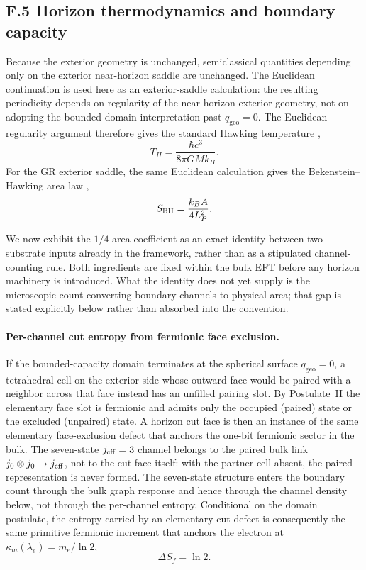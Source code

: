 \documentclass[11pt]{article}
\begin{document}
\subsection*{F.5 Horizon thermodynamics and boundary capacity}

Because the exterior geometry is unchanged, semiclassical quantities depending only on the exterior near-horizon saddle are unchanged. The Euclidean continuation is used here as an exterior-saddle calculation: the resulting periodicity depends on regularity of the near-horizon exterior geometry, not on adopting the bounded-domain interpretation past $q_{\mathrm{geo}}=0$. The Euclidean regularity argument therefore gives the standard Hawking temperature \citep{Hawking1975,GibbonsHawking1977},
\[
T_H=\frac{\hbar c^3}{8\pi GM k_B}.
\]
For the GR exterior saddle, the same Euclidean calculation gives the Bekenstein--Hawking area law \citep{Bekenstein1973,Hawking1975},
\[
S_{\rm BH}=\frac{k_BA}{4L_P^2}.
\]

We now exhibit the $1/4$ area coefficient as an exact identity between two substrate inputs already in the framework, rather than as a stipulated channel-counting rule. Both ingredients are fixed within the bulk EFT before any horizon machinery is introduced. What the identity does not yet supply is the microscopic count converting boundary channels to physical area; that gap is stated explicitly below rather than absorbed into the convention.

\paragraph{Per-channel cut entropy from fermionic face exclusion.}
If the bounded-capacity domain terminates at the spherical surface $q_{\mathrm{geo}}=0$, a tetrahedral cell on the exterior side whose outward face would be paired with a neighbor across that face instead has an unfilled pairing slot. By Postulate~II the elementary face slot is fermionic and admits only the occupied (paired) state or the excluded (unpaired) state. A horizon cut face is then an instance of the same elementary face-exclusion defect that anchors the one-bit fermionic sector in the bulk. The seven-state $j_{\rm eff}=3$ channel belongs to the paired bulk link $j_0\otimes j_0\to j_{\rm eff}$, not to the cut face itself: with the partner cell absent, the paired representation is never formed. The seven-state structure enters the boundary count through the bulk graph response and hence through the channel density below, not through the per-channel entropy. Conditional on the domain postulate, the entropy carried by an elementary cut defect is consequently the same primitive fermionic increment that anchors the electron at $\kappa_m(\lambda_e)=m_e/\ln 2$,
\[
\Delta S_f=\ln 2.
\]
\end{document}
